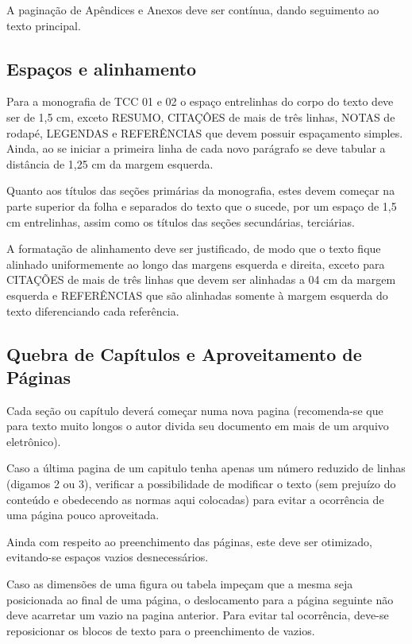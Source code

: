 A paginação de Apêndices e Anexos deve ser contínua, dando seguimento ao 
texto principal.

\subsection{Espaços e alinhamento}

Para a monografia de TCC 01 e 02 o espaço entrelinhas do corpo do texto 
deve ser de 1,5 cm, exceto RESUMO, CITAÇÔES de mais de três linhas, NOTAS 
de rodapé, LEGENDAS e REFERÊNCIAS que devem possuir espaçamento simples. 
Ainda, ao se iniciar a primeira linha de cada novo parágrafo se deve 
tabular a distância de 1,25 cm da margem esquerda.

Quanto aos títulos das seções primárias da monografia, estes devem começar 
na parte superior da folha e separados do texto que o sucede, por um espaço 
de 1,5 cm entrelinhas, assim como os títulos das seções secundárias, 
terciárias. 

A formatação de alinhamento deve ser justificado, de modo que o texto fique 
alinhado uniformemente ao longo das margens esquerda e direita, exceto para 
CITAÇÕES de mais de três linhas que devem ser alinhadas a 04 cm da margem 
esquerda e REFERÊNCIAS que são alinhadas somente à margem esquerda do texto 
diferenciando cada referência.

\subsection{Quebra de Capítulos e Aproveitamento de Páginas}

Cada seção ou capítulo deverá começar numa nova pagina (recomenda-se que 
para texto muito longos o autor divida seu documento em mais de um arquivo 
eletrônico). 

Caso a última pagina de um capitulo tenha apenas um número reduzido de 
linhas (digamos 2 ou 3), verificar a possibilidade de modificar o texto 
(sem prejuízo do conteúdo e obedecendo as normas aqui colocadas) para 
evitar a ocorrência de uma página pouco aproveitada.

Ainda com respeito ao preenchimento das páginas, este deve ser otimizado, 
evitando-se espaços vazios desnecessários. 

Caso as dimensões de uma figura ou tabela impeçam que a mesma seja 
posicionada ao final de uma página, o deslocamento para a página seguinte 
não deve acarretar um vazio na pagina anterior. Para evitar tal ocorrência, 
deve-se reposicionar os blocos de texto para o preenchimento de vazios. 

